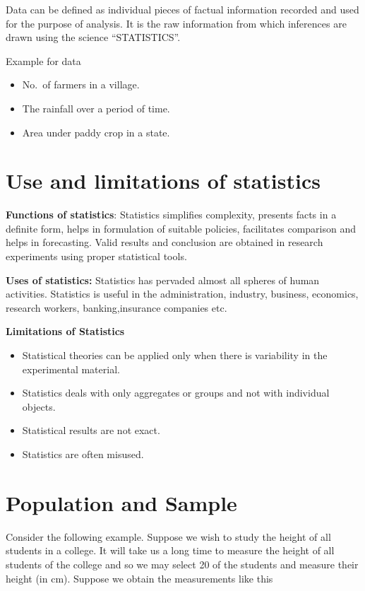 \documentclass[
]{book}
\begin{document}
Data can be defined as individual pieces of factual information recorded
and used for the purpose of analysis. It is the raw information from
which inferences are drawn using the science ``STATISTICS''.

Example for data

\begin{itemize}
\item
  No.~of farmers in a village.
\item
  The rainfall over a period of time.
\item
  Area under paddy crop in a state.
\end{itemize}

\section{Use and limitations of statistics}\label{use-and-limitations-of-statistics}

\textbf{Functions of statistics}: Statistics simplifies complexity, presents
facts in a definite form, helps in formulation of suitable policies,
facilitates comparison and helps in forecasting. Valid results and
conclusion are obtained in research experiments using proper statistical
tools.

\textbf{Uses of statistics:} Statistics has pervaded almost all spheres of
human activities. Statistics is useful in the administration, industry,
business, economics, research workers, banking,insurance companies etc.

\textbf{Limitations of Statistics}

\begin{itemize}
\item
  Statistical theories can be applied only when there is variability
  in the experimental material.
\item
  Statistics deals with only aggregates or groups and not with
  individual objects.
\item
  Statistical results are not exact.
\item
  Statistics are often misused.
\end{itemize}

\section{Population and Sample}\label{population-and-sample}

Consider the following example. Suppose we wish to study the height of
all students in a college. It will take us a long time to measure the
height of all students of the college and so we may select 20 of the
students and measure their height (in cm). Suppose we obtain the
measurements like this
\end{document}
